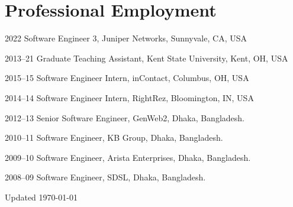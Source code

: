 \documentclass[11pt,letterpaper]{report}
\begin{document}
    \section*{Professional Employment}

    \begin{tablist}

        \item[2022] \tab{}Software Engineer 3, Juniper Networks, Sunnyvale, CA, USA
        \item[2013--21] \tab{}Graduate Teaching Assistant, Kent State University, Kent, OH, USA
        \item[2015--15] \tab{}Software Engineer Intern, inContact, Columbus, OH, USA
        \item[2014--14] \tab{}Software Engineer Intern, RightRez, Bloomington, IN, USA
        \item[2012--13] \tab{}Senior Software Engineer, GenWeb2, Dhaka, Bangladesh.
        \item[2010--11] \tab{}Software Engineer, KB Group, Dhaka, Bangladesh.
        \item[2009--10] \tab{}Software Engineer, Arista Enterprises, Dhaka, Bangladesh.
        \item[2008--09] \tab{}Software Engineer, SDSL, Dhaka, Bangladesh.
                
    \end{tablist}



    \begin{center}
        \vfill
        Updated \monthyeardate\today
    \end{center}
\end{document}
